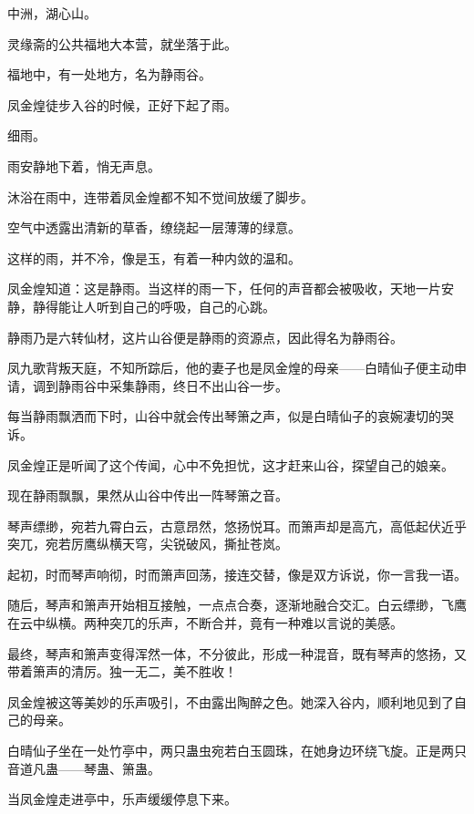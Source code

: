 
\begin{this_body}



中洲，湖心山。

灵缘斋的公共福地大本营，就坐落于此。

福地中，有一处地方，名为静雨谷。

凤金煌徒步入谷的时候，正好下起了雨。

细雨。

雨安静地下着，悄无声息。

沐浴在雨中，连带着凤金煌都不知不觉间放缓了脚步。

空气中透露出清新的草香，缭绕起一层薄薄的绿意。

这样的雨，并不冷，像是玉，有着一种内敛的温和。

凤金煌知道：这是静雨。当这样的雨一下，任何的声音都会被吸收，天地一片安静，静得能让人听到自己的呼吸，自己的心跳。

静雨乃是六转仙材，这片山谷便是静雨的资源点，因此得名为静雨谷。

凤九歌背叛天庭，不知所踪后，他的妻子也是凤金煌的母亲——白晴仙子便主动申请，调到静雨谷中采集静雨，终日不出山谷一步。

每当静雨飘洒而下时，山谷中就会传出琴箫之声，似是白晴仙子的哀婉凄切的哭诉。

凤金煌正是听闻了这个传闻，心中不免担忧，这才赶来山谷，探望自己的娘亲。

现在静雨飘飘，果然从山谷中传出一阵琴箫之音。

琴声缥缈，宛若九霄白云，古意昂然，悠扬悦耳。而箫声却是高亢，高低起伏近乎突兀，宛若厉鹰纵横天穹，尖锐破风，撕扯苍岚。

起初，时而琴声响彻，时而箫声回荡，接连交替，像是双方诉说，你一言我一语。

随后，琴声和箫声开始相互接触，一点点合奏，逐渐地融合交汇。白云缥缈，飞鹰在云中纵横。两种突兀的乐声，不断合并，竟有一种难以言说的美感。

最终，琴声和箫声变得浑然一体，不分彼此，形成一种混音，既有琴声的悠扬，又带着箫声的清厉。独一无二，美不胜收！

凤金煌被这等美妙的乐声吸引，不由露出陶醉之色。她深入谷内，顺利地见到了自己的母亲。

白晴仙子坐在一处竹亭中，两只蛊虫宛若白玉圆珠，在她身边环绕飞旋。正是两只音道凡蛊——琴蛊、箫蛊。

当凤金煌走进亭中，乐声缓缓停息下来。


\end{this_body}
